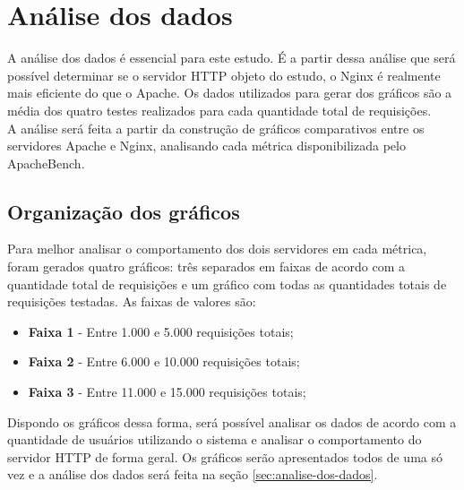 \chapter{Análise dos dados}\label{cap:analise-dos-dados}
A análise dos dados é essencial para este estudo. É a partir dessa análise que 
será possível determinar se o servidor HTTP objeto do estudo, o Nginx é 
realmente mais eficiente do que o Apache. Os dados utilizados para gerar dos 
gráficos são a média dos quatro testes realizados para cada quantidade total de 
requisições.\\
A análise será feita a partir da construção de gráficos comparativos entre os 
servidores Apache e Nginx, analisando cada métrica disponibilizada pelo 
ApacheBench.
\section{Organização dos gráficos}
Para melhor analisar o comportamento dos dois servidores em cada métrica, foram 
gerados quatro gráficos: três separados em faixas de 
acordo com a quantidade total de requisições e um gráfico com todas as 
quantidades totais de requisições testadas. As faixas de valores são:
\begin{itemize}
	\item \textbf{Faixa 1} - Entre 1.000 e 5.000 requisições totais;
	\item \textbf{Faixa 2} - Entre 6.000 e 10.000 requisições totais;
	\item \textbf{Faixa 3} - Entre 11.000 e 15.000 requisições totais;
\end{itemize}
Dispondo os gráficos dessa forma, será possível analisar os dados de acordo com 
a quantidade de usuários utilizando o sistema e analisar o comportamento do 
servidor HTTP de forma geral. Os gráficos serão apresentados todos de uma só 
vez e a análise dos dados será feita na seção \ref{sec:analise-dos-dados}.


%
